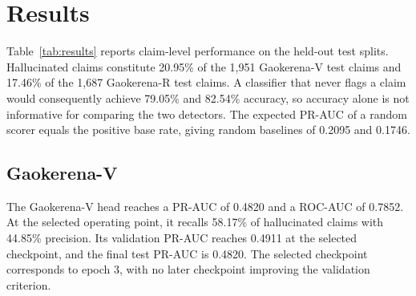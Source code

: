 \documentclass[conference]{IEEEtran}
\begin{document}
\section{Results}

Table~\ref{tab:results} reports claim-level performance on the held-out test splits. Hallucinated claims constitute 20.95\% of the 1,951 Gaokerena-V test claims and 17.46\% of the 1,687 Gaokerena-R test claims. A classifier that never flags a claim would consequently achieve 79.05\% and 82.54\% accuracy, so accuracy alone is not informative for comparing the two detectors. The expected PR-AUC of a random scorer equals the positive base rate, giving random baselines of 0.2095 and 0.1746.

\begin{table}[ht]
\centering
\small
\caption{Claim-level uncertainty-head performance on the held-out test splits (\%).}
\label{tab:results}
\end{table}

\subsection{Gaokerena-V}

The Gaokerena-V head reaches a PR-AUC of 0.4820 and a ROC-AUC of 0.7852. At the selected operating point, it recalls 58.17\% of hallucinated claims with 44.85\% precision. Its validation PR-AUC reaches 0.4911 at the selected checkpoint, and the final test PR-AUC is 0.4820. The selected checkpoint corresponds to epoch 3, with no later checkpoint improving the validation criterion.
\end{document}
